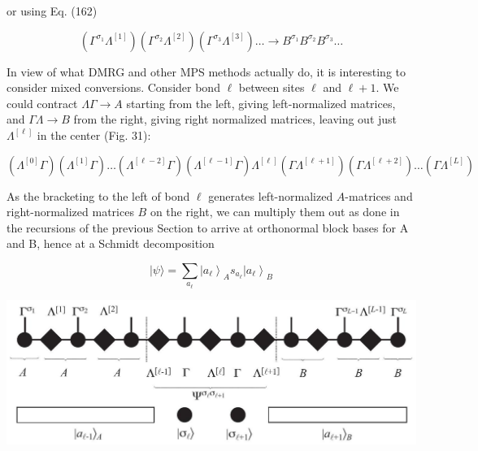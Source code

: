 \documentclass[12pt]{article}
\begin{document}
or using Eq. (162)


\begin{equation*}
\left(\Gamma^{\sigma_{1}} \Lambda^{[1]}\right)\left(\Gamma^{\sigma_{2}} \Lambda^{[2]}\right)\left(\Gamma^{\sigma_{3}} \Lambda^{[3]}\right) \ldots \rightarrow B^{\sigma_{1}} B^{\sigma_{2}} B^{\sigma_{3}} \ldots \tag{167}
\end{equation*}


In view of what DMRG and other MPS methods actually do, it is interesting to consider mixed conversions. Consider bond $\ell$ between sites $\ell$ and $\ell+1$. We could contract $\Lambda \Gamma \rightarrow A$ starting from the left, giving left-normalized matrices, and $\Gamma \Lambda \rightarrow B$ from the right, giving right normalized matrices, leaving out just $\Lambda^{[\ell]}$ in the center (Fig. 31):


\begin{equation*}
\left(\Lambda^{[0]} \Gamma\right)\left(\Lambda^{[1]} \Gamma\right) \ldots\left(\Lambda^{[\ell-2]} \Gamma\right)\left(\Lambda^{[\ell-1]} \Gamma\right) \Lambda^{[\ell]}\left(\Gamma \Lambda^{[\ell+1]}\right)\left(\Gamma \Lambda^{[\ell+2]}\right) \ldots\left(\Gamma \Lambda^{[L]}\right) \tag{168}
\end{equation*}


As the bracketing to the left of bond $\ell$ generates left-normalized $A$-matrices and right-normalized matrices $B$ on the right, we can multiply them out as done in the recursions of the previous Section to arrive at orthonormal block bases for A and B, hence at a Schmidt decomposition


\begin{equation*}
|\psi\rangle=\sum_{a_{\ell}}\left|a_{\ell}\right\rangle_{A} s_{a_{\ell}}\left|a_{\ell}\right\rangle_{B} \tag{169}
\end{equation*}


\begin{center}
\includegraphics[max width=\textwidth]{2024_05_04_afc4ad226da9ccfe0ac8g-054}
\end{center}
\end{document}
